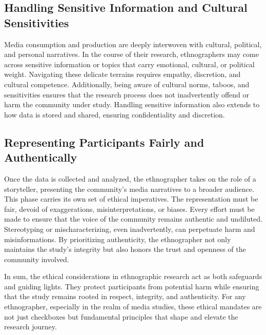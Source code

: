 \documentclass[
  b5paper]{book}
\begin{document}
\hypertarget{handling-sensitive-information-and-cultural-sensitivities}{%
\subsection*{Handling Sensitive Information and Cultural Sensitivities}\label{handling-sensitive-information-and-cultural-sensitivities}}

Media consumption and production are deeply interwoven with cultural, political, and personal narratives. In the course of their research, ethnographers may come across sensitive information or topics that carry emotional, cultural, or political weight. Navigating these delicate terrains requires empathy, discretion, and cultural competence. Additionally, being aware of cultural norms, taboos, and sensitivities ensures that the research process does not inadvertently offend or harm the community under study. Handling sensitive information also extends to how data is stored and shared, ensuring confidentiality and discretion.

\hypertarget{representing-participants-fairly-and-authentically}{%
\subsection*{Representing Participants Fairly and Authentically}\label{representing-participants-fairly-and-authentically}}

Once the data is collected and analyzed, the ethnographer takes on the role of a storyteller, presenting the community's media narratives to a broader audience. This phase carries its own set of ethical imperatives. The representation must be fair, devoid of exaggerations, misinterpretations, or biases. Every effort must be made to ensure that the voice of the community remains authentic and undiluted. Stereotyping or mischaracterizing, even inadvertently, can perpetuate harm and misinformations. By prioritizing authenticity, the ethnographer not only maintains the study's integrity but also honors the trust and openness of the community involved.

In sum, the ethical considerations in ethnographic research act as both safeguards and guiding lights. They protect participants from potential harm while ensuring that the study remains rooted in respect, integrity, and authenticity. For any ethnographer, especially in the realm of media studies, these ethical mandates are not just checkboxes but fundamental principles that shape and elevate the research journey.
\end{document}
